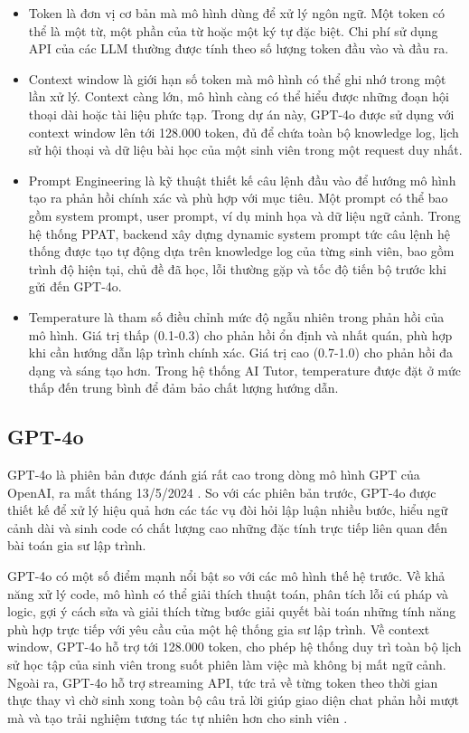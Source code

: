 \documentclass[../main.tex]{subfiles}
\begin{document}
\begin{itemize}
    \item Token là đơn vị cơ bản mà mô hình dùng để xử lý ngôn ngữ. Một token có thể là một từ, một phần của từ hoặc một ký tự đặc biệt. Chi phí sử dụng API của các LLM thường được tính theo số lượng token đầu vào và đầu ra.
    \item Context window là giới hạn số token mà mô hình có thể ghi nhớ trong một lần xử lý. Context càng lớn, mô hình càng có thể hiểu được những đoạn hội thoại dài hoặc tài liệu phức tạp. Trong dự án này, GPT-4o được sử dụng với context window lên tới 128.000 token, đủ để chứa toàn bộ knowledge log, lịch sử hội thoại và dữ liệu bài học của một sinh viên trong một request duy nhất.
    \item Prompt Engineering là kỹ thuật thiết kế câu lệnh đầu vào để hướng mô hình tạo ra phản hồi chính xác và phù hợp với mục tiêu. Một prompt có thể bao gồm system prompt, user prompt, ví dụ minh họa và dữ liệu ngữ cảnh. Trong hệ thống PPAT, backend xây dựng dynamic system prompt tức câu lệnh hệ thống được tạo tự động dựa trên knowledge log của từng sinh viên, bao gồm trình độ hiện tại, chủ đề đã học, lỗi thường gặp và tốc độ tiến bộ trước khi gửi đến GPT-4o.
    \item Temperature là tham số điều chỉnh mức độ ngẫu nhiên trong phản hồi của mô hình. Giá trị thấp (0.1-0.3) cho phản hồi ổn định và nhất quán, phù hợp khi cần hướng dẫn lập trình chính xác. Giá trị cao (0.7-1.0) cho phản hồi đa dạng và sáng tạo hơn. Trong hệ thống AI Tutor, temperature được đặt ở mức thấp đến trung bình để đảm bảo chất lượng hướng dẫn.
\end{itemize}

\subsection{GPT-4o}

GPT-4o là phiên bản được đánh giá rất cao trong dòng mô hình GPT của OpenAI, ra mắt tháng 13/5/2024 \cite{openai2024hellogpt4o}. So với các phiên bản trước, GPT-4o được thiết kế để xử lý hiệu quả hơn các tác vụ đòi hỏi lập luận nhiều bước, hiểu ngữ cảnh dài và sinh code có chất lượng cao những đặc tính trực tiếp liên quan đến bài toán gia sư lập trình.

GPT-4o có một số điểm mạnh nổi bật so với các mô hình thế hệ trước. Về khả năng xử lý code, mô hình có thể giải thích thuật toán, phân tích lỗi cú pháp và logic, gợi ý cách sửa và giải thích từng bước giải quyết bài toán những tính năng phù hợp trực tiếp với yêu cầu của một hệ thống gia sư lập trình. Về context window, GPT-4o hỗ trợ tới 128.000 token, cho phép hệ thống duy trì toàn bộ lịch sử học tập của sinh viên trong suốt phiên làm việc mà không bị mất ngữ cảnh. Ngoài ra, GPT-4o hỗ trợ streaming API, tức trả về từng token theo thời gian thực thay vì chờ sinh xong toàn bộ câu trả lời giúp giao diện chat phản hồi mượt mà và tạo trải nghiệm tương tác tự nhiên hơn cho sinh viên \cite{openai2024apidocs}.
\end{document}
